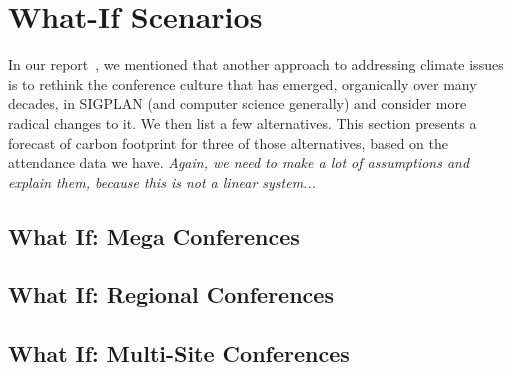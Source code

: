\section{What-If Scenarios}

In our report~\cite{climate_report}, we mentioned that another approach to addressing climate issues is to rethink the conference culture that has emerged, organically over many decades, in SIGPLAN (and computer science generally) and consider more radical changes to it. We then list a few alternatives. This section presents a forecast of carbon footprint for three of those alternatives, based on the attendance data we have. \emph{Again, we need to make a lot of assumptions and explain them, because this is not a linear system...}

\subsection{What If: Mega Conferences}

\subsection{What If: Regional Conferences}

\subsection{What If: Multi-Site Conferences}


